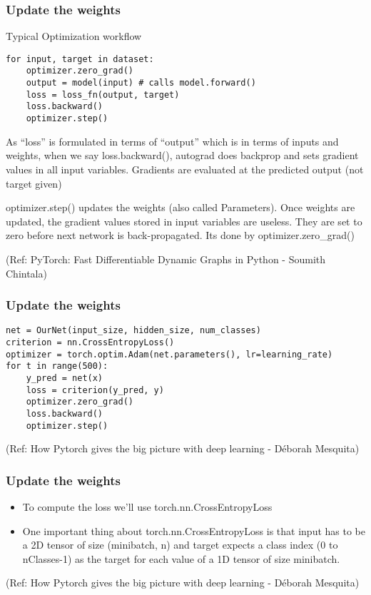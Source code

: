 \begin{frame}[fragile] \frametitle{Update the weights}
Typical Optimization workflow

 \begin{lstlisting}
for input, target in dataset:
	optimizer.zero_grad()
	output = model(input) # calls model.forward()
	loss = loss_fn(output, target)
	loss.backward()
	optimizer.step()
\end{lstlisting}

As ``loss'' is formulated in terms of ``output'' which is in terms of inputs and weights, when we say loss.backward(), autograd does backprop and sets gradient values in all input variables. Gradients are evaluated at the predicted output (not target given)

optimizer.step() updates the weights (also called Parameters). Once weights are updated, the gradient values stored in input variables are useless. They are set to zero before next network is back-propagated. Its done by optimizer.zero\_grad()

  {\tiny (Ref: PyTorch: Fast Differentiable Dynamic Graphs in Python - Soumith Chintala)}
\end{frame}


\begin{frame}[fragile] \frametitle{Update the weights}


 \begin{lstlisting}
net = OurNet(input_size, hidden_size, num_classes)
criterion = nn.CrossEntropyLoss()
optimizer = torch.optim.Adam(net.parameters(), lr=learning_rate)
for t in range(500):
    y_pred = net(x)
    loss = criterion(y_pred, y)
    optimizer.zero_grad()
    loss.backward()
    optimizer.step()
\end{lstlisting}

  {\tiny (Ref: How Pytorch gives the big picture with deep learning - Déborah Mesquita)}
\end{frame}


\begin{frame}[fragile] \frametitle{Update the weights}
\begin{itemize}
\item To compute the loss we'll use torch.nn.CrossEntropyLoss
\item 
One important thing about torch.nn.CrossEntropyLoss is that input has to be a 2D tensor of size (minibatch, n) and target expects a class index (0 to nClasses-1) as the target for each value of a 1D tensor of size minibatch.
\end{itemize}

  {\tiny (Ref: How Pytorch gives the big picture with deep learning - Déborah Mesquita)}
\end{frame}

